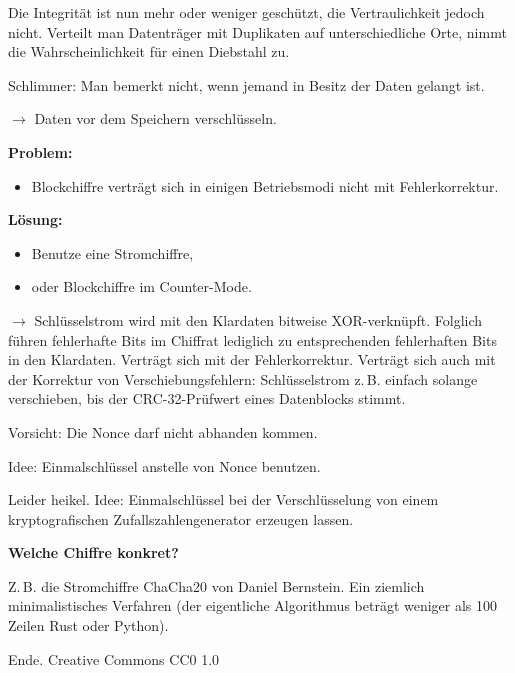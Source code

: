 \documentclass[9pt]{beamer}
\newcommand{\modest}[1]{{\small\color{gray}#1}}
\newcommand{\strong}[1]{\textsf{\textbf{#1}}}
\begin{document}
\begin{frame}
Die Integrität ist nun mehr oder weniger geschützt, die
Vertraulichkeit jedoch nicht. Verteilt man Datenträger mit Duplikaten
auf unterschiedliche Orte, nimmt die Wahrscheinlichkeit für einen
Diebstahl zu.\pause

\vspace{1em}
Schlimmer: Man bemerkt nicht, wenn jemand in Besitz der Daten
gelangt ist.\pause

\vspace{1em}
$\rightarrow$ Daten vor dem Speichern verschlüsseln.\pause

\vspace{1em}
\strong{Problem:}
\begin{itemize}
\item Blockchiffre verträgt sich in einigen Betriebsmodi
  nicht mit Fehlerkorrektur.
\end{itemize}
\end{frame}

\begin{frame}
\strong{Lösung:}
\begin{itemize}
\item Benutze eine Stromchiffre,
\item oder Blockchiffre im Counter-Mode.
\end{itemize}\pause
\vspace{1em}
$\rightarrow$ Schlüsselstrom wird mit den Klardaten bitweise
XOR-verknüpft. Folglich führen fehlerhafte Bits im Chiffrat
lediglich zu entsprechenden fehlerhaften Bits in den Klardaten.
Verträgt sich mit der Fehlerkorrektur. Verträgt sich auch mit
der Korrektur von Verschiebungsfehlern: Schlüsselstrom z.\,B. einfach
solange verschieben, bis der CRC-32-Prüfwert eines Datenblocks
stimmt.
\end{frame}

\begin{frame}
Vorsicht: Die Nonce darf nicht abhanden kommen.\pause

\vspace{1em}
Idee: Einmalschlüssel anstelle von Nonce benutzen.\pause

\vspace{1em}
Leider heikel. Idee: Einmalschlüssel bei der Verschlüsselung
von einem kryptografischen Zufallszahlengenerator erzeugen lassen.
\end{frame}

\begin{frame}
\strong{Welche Chiffre konkret?}

\vspace{1em}
Z.\,B. die Stromchiffre ChaCha20 von Daniel
Bernstein. Ein ziemlich minimalistisches Verfahren (der eigentliche
Algorithmus beträgt weniger als 100 Zeilen Rust oder Python).
\end{frame}

\begin{frame}
Ende.
\vfill\hfill
\modest{Creative Commons CC0 1.0}
\end{frame}
\end{document}
